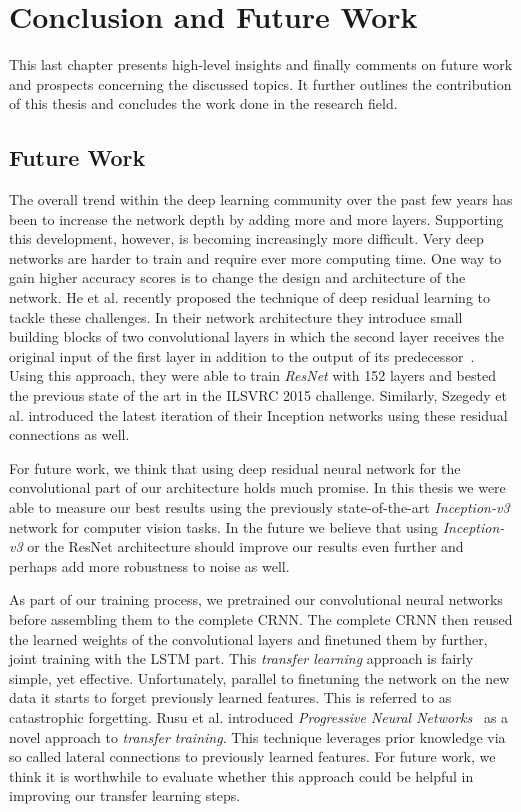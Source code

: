 \section{Conclusion and Future Work}
\label{sec:summary}
This last chapter presents high-level insights and finally comments on
future work and prospects concerning the discussed topics.
It further outlines the contribution of this thesis and concludes the work done
in the research field.

\subsection{Future Work}
The overall trend within the deep learning community over the past few years has been to increase the network depth by adding more and more layers. Supporting this development, however, is becoming increasingly more difficult. Very deep networks are harder to train and require ever more computing time. One way to gain higher accuracy scores is to change the design and architecture of the network. He et al. recently proposed the technique of deep residual learning\cite{he2016deep} to tackle these challenges. In their network architecture they introduce small building blocks of two convolutional layers in which the second layer receives the original input of the first layer in addition to the output of its predecessor~\cite{he2016deep}. Using this approach, they were able to train \emph{ResNet} with 152 layers and bested the previous state of the art in the ILSVRC 2015 challenge. Similarly, Szegedy et al. introduced the latest iteration of their Inception networks using these residual connections\cite{szegedy2016inception} as well.

For future work, we think that using deep residual neural network for the convolutional part of our architecture holds much promise. In this thesis we were able to measure our best results using the previously state-of-the-art \emph{Inception-v3} network for computer vision tasks. In the future we believe that using \emph{Inception-v3} or the ResNet architecture should improve our results even further and perhaps add more robustness to noise as well.

As part of our training process, we pretrained our convolutional neural networks before assembling them to the complete CRNN. The complete CRNN then reused the learned weights of the convolutional layers and finetuned them by further, joint training with the LSTM part. This \emph{transfer learning} approach is fairly simple, yet effective. Unfortunately, parallel to finetuning the network on the new data it starts to forget previously learned features. This is referred to as catastrophic forgetting. Rusu et al. introduced \emph{Progressive Neural Networks}~\cite{rusu2016progressive} as a novel approach to \emph{transfer training}. This technique leverages prior knowledge via so called lateral connections to previously learned features. For future work, we think it is worthwhile to evaluate whether this approach could be helpful in improving our transfer learning steps.

